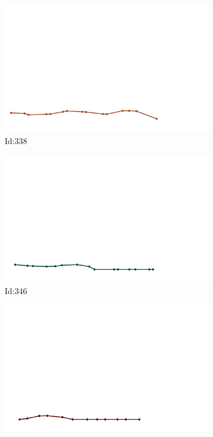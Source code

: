 \documentclass[12pt,twoside]{report}
\begin{document}
\begin{figure}
\centering
\begin{subfigure}[b]{0.20\textwidth}
\centering
\includegraphics[width=\textwidth]{../../trajectories/338.png}
\caption{Id:338}
\end{subfigure}
\begin{subfigure}[b]{0.20\textwidth}
\centering
\includegraphics[width=\textwidth]{../../trajectories/346.png}
\caption{Id:346}
\end{subfigure}
\begin{subfigure}[b]{0.20\textwidth}
\centering
\includegraphics[width=\textwidth]{../../trajectories/390.png}

\end{subfigure}
\end{figure}
\end{document}
